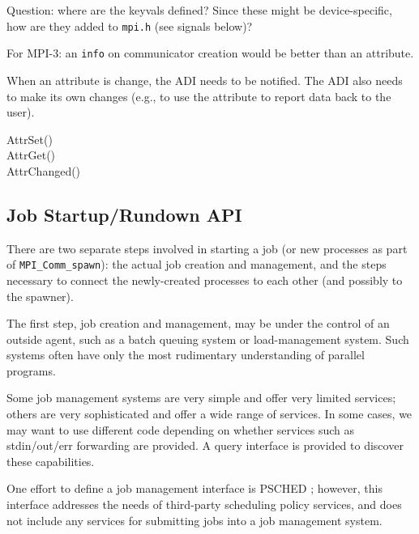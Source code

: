 \documentclass{article}
\let\file=\texttt
\let\code=\texttt
\begin{document}
Question: where are the keyvals defined?  Since these might be
device-specific, how are they added to \file{mpi.h} (see signals below)?  

For MPI-3: an \code{info} on communicator creation would be better than an
attribute. 

When an attribute is change, the ADI needs to be notified.  The ADI also needs
to make its own changes (e.g., to use the attribute to report data back to the
user).

\begin{description}
\item[AttrSet()]
\item[AttrGet()]
\item[AttrChanged()]
\end{description}

\subsection{Job Startup/Rundown API}

There are two separate steps involved in starting a job (or new processes as
part of \code{MPI\_Comm\_spawn}): the actual job creation and management, and
the steps necessary to connect the newly-created processes to each other (and
possibly to the spawner).  

The first step, job creation and management, may be under the control of an
outside agent, such as a batch queuing system or load-management system.  Such
systems often have only the most rudimentary understanding of parallel
programs.

Some job management systems are very simple and offer very limited
services; others are very sophisticated and offer a wide range of services.
In some cases, we may want to use different code depending on whether services
such as stdin/out/err forwarding are provided.  A query interface is provided
to discover these capabilities.

One effort to define a job management interface is PSCHED \cite{psched01};
however, this interface addresses the needs of third-party scheduling policy
services, and does not include any services for submitting jobs into a job
management system.
\end{document}
